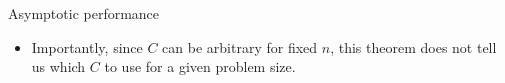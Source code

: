 \documentclass[11pt,compress,t,notes=noshow, xcolor=table]{beamer}
\begin{document}
\begin{vbframe}{Asymptotic performance}
\begin{itemize}
    \begin{itemize}
      \item $n \cdot C(n)$ tends to infinity, which means that the
      relative impact of the regularizer compared to the empirical
      risk decays to zero, so, the risk term takes over for
      large~$n$;
      \item The convergence of $n \cdot C(n)$ to infinity is slow
      enough to avoid overfitting (this is far from obvious, but
      it is in the details of the proof of the theorem).
    \end{itemize}
    \item Importantly, since $C$ can be arbitrary for fixed $n$, this
    theorem does not tell us which $C$ to use for a given problem
    size.
  \end{itemize}

\end{vbframe}
\end{document}

